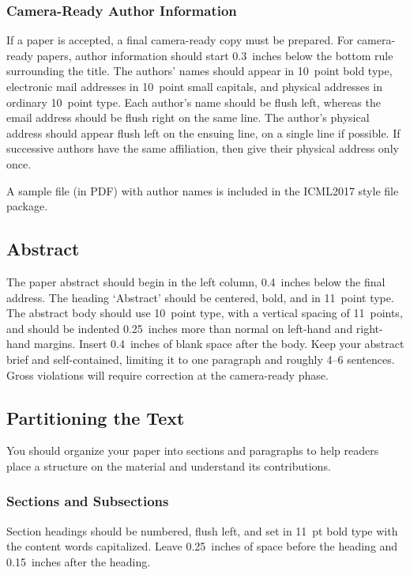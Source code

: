 \documentclass{article}
\begin{document}
\subsubsection{Camera-Ready Author Information}
\label{final author}

If a paper is accepted, a final camera-ready copy must be prepared.
%
For camera-ready papers, author information should start 0.3~inches
below the bottom rule surrounding the title. The authors' names should
appear in 10~point bold type, electronic mail addresses in 10~point
small capitals, and physical addresses in ordinary 10~point type.
Each author's name should be flush left, whereas the email address
should be flush right on the same line. The author's physical address
should appear flush left on the ensuing line, on a single line if
possible. If successive authors have the same affiliation, then give
their physical address only once.

A sample file (in PDF) with author names is included in the ICML2017 
style file package.

\subsection{Abstract}

The paper abstract should begin in the left column, 0.4~inches below
the final address. The heading `Abstract' should be centered, bold,
and in 11~point type. The abstract body should use 10~point type, with
a vertical spacing of 11~points, and should be indented 0.25~inches
more than normal on left-hand and right-hand margins. Insert
0.4~inches of blank space after the body. Keep your abstract brief and 
self-contained,
limiting it to one paragraph and roughly 4--6 sentences.  Gross violations will require correction at the camera-ready phase.

\subsection{Partitioning the Text} 

You should organize your paper into sections and paragraphs to help
readers place a structure on the material and understand its
contributions.

\subsubsection{Sections and Subsections}

Section headings should be numbered, flush left, and set in 11~pt bold
type with the content words capitalized. Leave 0.25~inches of space
before the heading and 0.15~inches after the heading.
\end{document}
